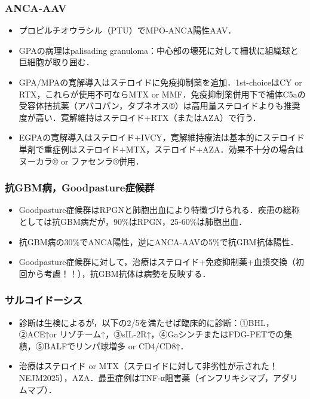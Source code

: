 \subsubsection{ANCA-AAV}
\begin{itemize}
\item プロピルチオウラシル（PTU）でMPO-ANCA陽性AAV．
\item GPAの病理はpalisading granuloma：中心部の壊死に対して柵状に組織球と巨細胞が取り囲む．
\item GPA/MPAの寛解導入はステロイドに免疫抑制薬を追加．1st-choiceはCY or RTX，これらが使用不可ならMTX or MMF．免疫抑制薬併用下で補体C5aの受容体拮抗薬（アバコパン，タブネオス®）は高用量ステロイドよりも推奨度が高い．寛解維持はステロイド+RTX（またはAZA）で行う．
\item EGPAの寛解導入はステロイド+IVCY，寛解維持療法は基本的にステロイド単剤で重症例はステロイド+MTX，ステロイド+AZA．効果不十分の場合はヌーカラ® or ファセンラ®併用．
\end{itemize}


\subsubsection{抗GBM病，Goodpasture症候群}
\begin{itemize}
\item Goodpasture症候群はRPGNと肺胞出血により特徴づけられる．疾患の総称としては抗GBM病だが，90\%はRPGN，25-60\%は肺胞出血．
\item 抗GBM病の30\%でANCA陽性，逆にANCA-AAVの5\%で抗GBM抗体陽性．
\item Goodpasture症候群に対して，治療はステロイド+免疫抑制薬+血漿交換（初回から考慮！！），抗GBM抗体は病勢を反映する．
\end{itemize}


\subsubsection{サルコイドーシス}

\begin{itemize}
\item 診断は生検によるが，以下の2/5を満たせば臨床的に診断：①BHL，②ACE↑or リゾチーム↑，③sIL-2R↑，④GaシンチまたはFDG-PETでの集積，⑤BALFでリンパ球増多 or CD4/CD8↑．
\item 治療はステロイド or MTX（ステロイドに対して非劣性が示された！NEJM2025），AZA．最重症例はTNF-α阻害薬（インフリキシマブ，アダリムマブ）．
\end{itemize}

